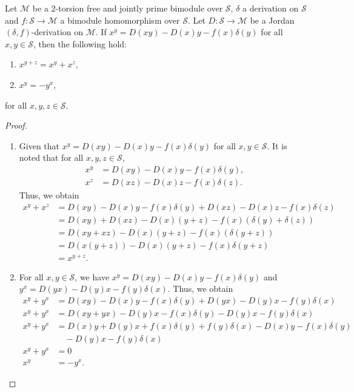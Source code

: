 \documentclass{arxiv}
\begin{document}
\begin{theorem}\label{teo3.3.1}
     Let $\mathcal{M}$ be a $2$-torsion free and jointly prime bimodule over $\mathcal{S}$, $\delta$ a derivation on $\mathcal{S}$ and $f : \mathcal{S} \rightarrow \mathcal{M}$ a bimodule homomorphism over $\mathcal{S}$. Let $D:\mathcal{S} \rightarrow \mathcal{M}$ be a Jordan $(\delta,f)$-derivation on $\mathcal{M}$. If $x^y=D(xy)-D(x)y-f(x)\delta(y)$ for all $x,y \in \mathcal{S}$, then the following hold:
    \begin{enumerate}
        \item $x^{y+z} = x^y + x^z$,
        \item $x^y = -y^x$,
    \end{enumerate}
    for all $x,y,z \in \mathcal{S}$.
\end{theorem}
\begin{proof}
    \begin{enumerate}
        \item Given that $x^y = D(xy)-D(x)y-f(x)\delta(y)$ for all $x,y \in \mathcal{S}$. It is noted that for all $x,y,z \in \mathcal{S}$,
        \begin{align*}
            x^y &= D(xy)-D(x)y-f(x)\delta(y),\\
            x^z &= D(xz)-D(x)z-f(x)\delta(z).
        \end{align*}
        Thus, we obtain
        \begin{align*}
            x^y + x^z &= D(xy)-D(x)y-f(x)\delta(y)+D(xz)-D(x)z-f(x)\delta(z)\\
            &= D(xy)+D(xz)-D(x)(y+z)-f(x)(\delta(y)+\delta(z))\\
            &= D(xy+xz)-D(x)(y+z)-f(x)(\delta(y+z))\\
            &= D(x(y+z))-D(x)(y+z)-f(x)\delta(y+z)\\
            &= x^{y+z}.
        \end{align*}
        \item For all $x,y \in \mathcal{S}$, we have $x^y = D(xy)-D(x)y-f(x)\delta(y)$ and $y^x=D(yx)-D(y)x-f(y)\delta(x)$. Thus, we obtain
        \begin{align*}
            x^y + y^x &= D(xy)-D(x)y-f(x)\delta(y) + D(yx)-D(y)x-f(y)\delta(x)\\
            x^y + y^x &= D(xy+yx) - D(y)x-f(x)\delta(y) -D(y)x-f(y)\delta(x)\\
            x^y+y^x &= D(x)y + D(y)x + f(x)\delta(y)+f(y)\delta(x) -D(x)y-f(x)\delta(y)\\
            &\quad -D(y)x-f(y)\delta(x)\\
            x^y+y^x &= 0\\
            x^y &= -y^x.
        \end{align*}
    \end{enumerate}
\end{proof}
\end{document}
